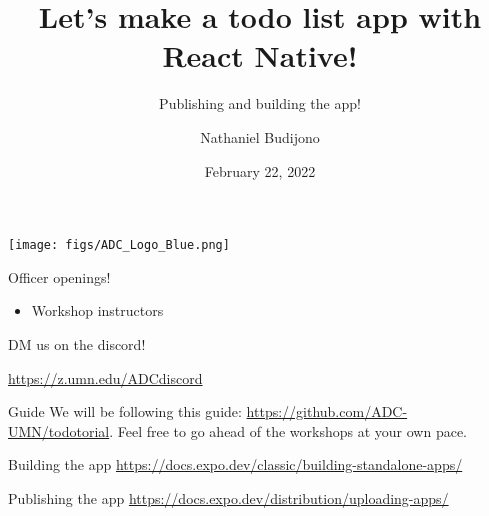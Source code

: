 \documentclass{beamer}
\title{Let's make a todo list app with React Native!}
\subtitle{Publishing and building the app!}
\author{Nathaniel Budijono}
\date{February 22, 2022}
\institute{UMN ADC}
\begin{document}
\begin{frame}
    \titlepage
    \texttt{[image: figs/ADC\_Logo\_Blue.png]}
\end{frame}

\begin{frame}{Officer openings!}
	\begin{itemize}
		\item Workshop instructors
	\end{itemize}

	\bigskip

	DM us on the discord!

	\bigskip

	\href{https://z.umn.edu/ADCdiscord}{https://z.umn.edu/ADCdiscord}
\end{frame}

\begin{frame}{Guide}
	We will be following this guide: \href{https://github.com/ADC-UMN/todotorial}{https://github.com/ADC-UMN/todotorial}. Feel free to go ahead of the workshops at your own pace.
\end{frame}


\begin{frame}{Building the app}
	\href{https://docs.expo.dev/classic/building-standalone-apps/}{https://docs.expo.dev/classic/building-standalone-apps/}
\end{frame}

\begin{frame}{Publishing the app}
	\href{https://docs.expo.dev/distribution/uploading-apps/}{https://docs.expo.dev/distribution/uploading-apps/}	
\end{frame}
\end{document}
